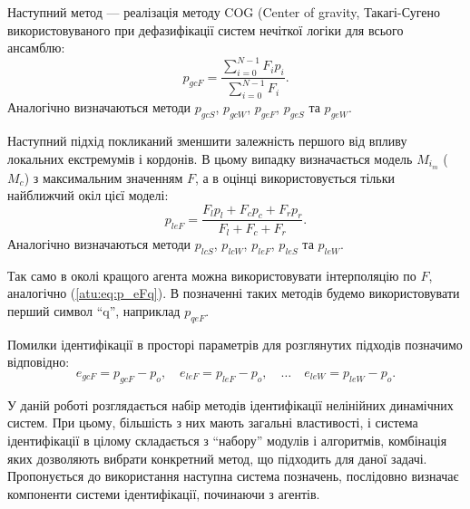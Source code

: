 \documentclass[a4paper,13pt]{atuaref}
\begin{document}
Наступний метод --- реалізація методу COG (Center of gravity, Такагі-Сугено %
використовуваного при дефазифікації систем нечіткої логіки для всього
ансамблю:
%
\begin{equation}
  p_{gcF}
  =
  \frac{\sum\limits_{i=0}^{N-1} F_{i} p_{i}}
       {\sum\limits_{i=0}^{N-1} F_{i} }
  .
  \label{atu:eq:p_gcF}
\end{equation}
%
Аналогічно визначаються методи
$p_{gcS}$,
$p_{gcW}$,
$p_{geF}$,
$p_{geS}$ та
$p_{geW}$.


Наступний підхід покликаний зменшити залежність першого від впливу локальних
екстремумів і кордонів. В цьому випадку визначається модель $ M_{i_{m}} $ ($ M_{c} $) з
максимальним значенням $ F $, а в оцінці використовується тільки найближчий
окіл цієї моделі:
%
\begin{equation}
  p_{leF}
  =
  \frac{ F_{l} p_{l} + F_{c} p_{c} + F_{r} p_{r} }
       { F_{l}       + F_{c}       + F_{r}       }
  .
  \label{atu:eq:p_lcFl}
\end{equation}
%
Аналогічно визначаються методи
$p_{lcS}$,
$p_{lcW}$,
$p_{leF}$,
$p_{leS}$ та
$p_{leW}$.


Так само в околі кращого агента можна використовувати інтерполяцію по
$ F $, аналогічно (\ref{atu:eq:p_eFq}). В позначенні таких методів будемо
використовувати перший символ ``q'', наприклад $ p_{qeF}$.

Помилки ідентифікації в просторі параметрів для розглянутих підходів позначимо відповідно:
%
\begin{equation}
  e_{gcF} = p_{gcF} - p_o,
  \quad
  e_{leF} = p_{leF} - p_o,
  \quad
  \ldots
  \quad
  e_{leW} = p_{leW} - p_o.
  \label{atu:eq:e_xx}
\end{equation}
%

У даній роботі розглядається набір методів ідентифікації нелінійних динамічних
систем. При цьому, більшість з них мають загальні властивості, і система
ідентифікації в цілому складається з ``набору'' модулів і алгоритмів,
комбінація яких дозволяють вибрати конкретний метод, що підходить для даної
задачі.
Пропонується до використання наступна система позначень, послідовно визначає
компоненти системи ідентифікації, починаючи з агентів.
\end{document}

